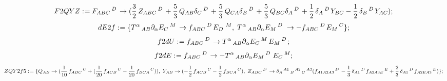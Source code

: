 \documentclass[11pt]{article}
\def\specialcolon{\mathrel{\mathop{:}}\hspace{-.5em}}
\begin{document}
\begin{dmath*}[compact, spread=2pt]
F2QYZ\specialcolon{}= {F}_{A B C}\,^{D\, } \rightarrow (\frac{3}{2}\, {Z}_{A B C}\,^{D\, } + \frac{5}{3}\, {Q}_{A B} {\delta}_{C}\,^{D\, } + \frac{5}{3}\, {Q}_{C A} {\delta}_{B}\,^{D\, } + \frac{5}{3}\, {Q}_{B C} {\delta}_{A}\,^{D\, } + \frac{1}{2}\, {\delta}_{A}\,^{D\, } {Y}_{B C} - \frac{1}{2}\, {\delta}_{B}\,^{D\, } {Y}_{A C});
\end{dmath*}
\begin{dmath*}[compact, spread=2pt]
dE2f\specialcolon{}= \{{T}^{\alpha}\,_{A B} {\partial}_{\alpha}{{E}_{C}\,^{M}}\,  \rightarrow {f}_{A B C}\,^{D\, } {E}_{D\, }\,^{M},\; {T}^{\alpha}\,_{A B} {\partial}_{\alpha}{{E}_{M}\,^{D\, }}\,  \rightarrow -{f}_{A B C}\,^{D\, } {E}_{M}\,^{C}\};
\end{dmath*}
\begin{dmath*}[compact, spread=2pt]
f2dU\specialcolon{}= {f}_{A B C}\,^{D\, } \rightarrow {T}^{\alpha}\,_{A B} {\partial}_{\alpha}{{E}_{C}\,^{M}}\,  {E}_{M}\,^{D\, };
\end{dmath*}
\begin{dmath*}[compact, spread=2pt]
f2dE\specialcolon{}= {f}_{A B C}\,^{D\, } \rightarrow -{T}^{\alpha}\,_{A B} {\partial}_{\alpha}{{E}_{M}\,^{D\, }}\,  {E}_{C}\,^{M};
\end{dmath*}
\begin{dmath*}[compact, spread=2pt]
ZQY2f5\specialcolon{}= \{{Q}_{A B} \rightarrow (\frac{1}{10}\, {f}_{A B C}\,^{C} + (\frac{1}{20}\, {f}_{A C B}\,^{C} - \frac{1}{20}\, {f}_{B C A}\,^{C})),\; {Y}_{A B} \rightarrow ( - \frac{1}{2}\, {f}_{A C B}\,^{C} - \frac{1}{2}\, {f}_{B C A}\,^{C}),\; {Z}_{A B C}\,^{D\, } \rightarrow {\delta}_{A}\,^{A1}\,_{B}\,^{A2}\,_{C}\,^{A3} ({f}_{A1 A2 A3}\,^{D\, } - \frac{1}{3}\, {\delta}_{A1}\,^{D\, } {f}_{A2 A3 E}\,^{E} + \frac{2}{3}\, {\delta}_{A1}\,^{D\, } {f}_{A2 E A3}\,^{E})\};
\end{dmath*}
\end{document}
